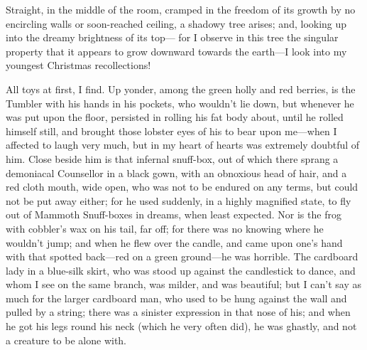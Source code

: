 Straight, in the middle of the room, cramped in the freedom of its
growth by no encircling walls or soon-reached ceiling, a shadowy
tree arises; and, looking up into the dreamy brightness of its top---%
for I observe in this tree the singular property that it appears to
grow downward towards the earth---I look into my youngest Christmas
recollections!

All toys at first, I find.  Up yonder, among the green holly and red
berries, is the Tumbler with his hands in his pockets, who wouldn't
lie down, but whenever he was put upon the floor, persisted in
rolling his fat body about, until he rolled himself still, and
brought those lobster eyes of his to bear upon me---when I affected
to laugh very much, but in my heart of hearts was extremely doubtful
of him.  Close beside him is that infernal snuff-box, out of which
there sprang a demoniacal Counsellor in a black gown, with an
obnoxious head of hair, and a red cloth mouth, wide open, who was
not to be endured on any terms, but could not be put away either;
for he used suddenly, in a highly magnified state, to fly out of
Mammoth Snuff-boxes in dreams, when least expected.  Nor is the frog
with cobbler's wax on his tail, far off; for there was no knowing
where he wouldn't jump; and when he flew over the candle, and came
upon one's hand with that spotted back---red on a green ground---he
was horrible.  The cardboard lady in a blue-silk skirt, who was
stood up against the candlestick to dance, and whom I see on the
same branch, was milder, and was beautiful; but I can't say as much
for the larger cardboard man, who used to be hung against the wall
and pulled by a string; there was a sinister expression in that nose
of his; and when he got his legs round his neck (which he very often
did), he was ghastly, and not a creature to be alone with.

